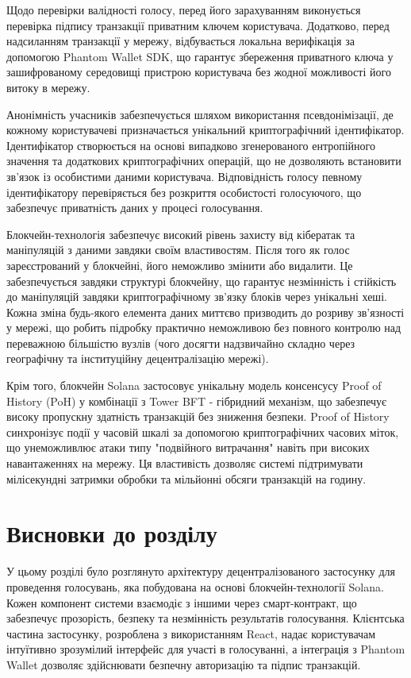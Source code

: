 \documentclass[14pt]{extreport}
\begin{document}
  Щодо перевірки валідності голосу, перед його зарахуванням виконується перевірка підпису транзакції приватним ключем користувача. Додатково, перед надсиланням транзакції у мережу, відбувається локальна верифікація за допомогою Phantom Wallet SDK, що гарантує збереження приватного ключа у зашифрованому середовищі пристрою користувача без жодної можливості його витоку в мережу.

  Анонімність учасників забезпечується шляхом використання псевдонімізації, де кожному користувачеві призначається унікальний криптографічний ідентифікатор. Ідентифікатор створюється на основі випадково згенерованого ентропійного значення та додаткових криптографічних операцій, що не дозволяють встановити зв'язок із особистими даними користувача. Відповідність голосу певному ідентифікатору перевіряється без розкриття особистості голосуючого, що забезпечує приватність даних у процесі голосування.
  
  Блокчейн-технологія забезпечує високий рівень захисту від кібератак та маніпуляцій з даними завдяки своїм властивостям. Після того як голос зареєстрований у блокчейні, його неможливо змінити або видалити. Це забезпечується завдяки структурі блокчейну, що гарантує незмінність і стійкість до маніпуляцій завдяки криптографічному зв'язку блоків через унікальні хеші. Кожна зміна будь-якого елемента даних миттєво призводить до розриву зв'язності у мережі, що робить підробку практично неможливою без повного контролю над переважною більшістю вузлів (чого досягти надзвичайно складно через географічну та інституційну децентралізацію мережі).
  
  Крім того, блокчейн Solana застосовує унікальну модель консенсусу Proof of History (PoH) у комбінації з Tower BFT - гібридний механізм, що забезпечує високу пропускну здатність транзакцій без зниження безпеки. Proof of History синхронізує події у часовій шкалі за допомогою криптографічних часових міток, що унеможливлює атаки типу "подвійного витрачання" навіть при високих навантаженнях на мережу. Ця властивість дозволяє системі підтримувати мілісекундні затримки обробки та мільйонні обсяги транзакцій на годину.
  
  \section{Висновки до розділу}
  
  У цьому розділі було розглянуто архітектуру децентралізованого застосунку для проведення голосувань, яка побудована на основі блокчейн-технології Solana. Кожен компонент системи взаємодіє з іншими через смарт-контракт, що забезпечує прозорість, безпеку та незмінність результатів голосування. Клієнтська частина застосунку, розроблена з використанням React, надає користувачам інтуїтивно зрозумілий інтерфейс для участі в голосуванні, а інтеграція з Phantom Wallet дозволяє здійснювати безпечну авторизацію та підпис транзакцій.
\end{document}
